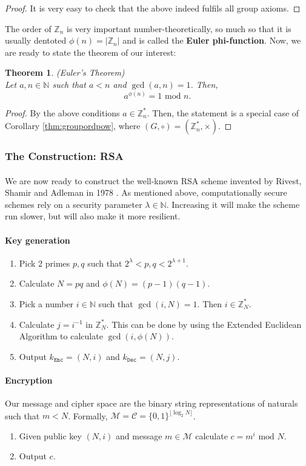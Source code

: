 \documentclass{article}
\newtheorem{theorem}{Theorem}[section]
\theoremstyle{definition}
\newcommand{\Enc}{\texttt{Enc}}
\newcommand{\Dec}{\texttt{Dec}}
\newcommand{\M}{\mathcal{M}}
\renewcommand{\C}{\mathcal{C}}
\newcommand{\Int}{\mathbb{Z}}
\newcommand{\Nat}{\mathbb{N}}
\renewcommand{\mod}{\,\,\text{mod}\,\,}
\begin{document}
\begin{proof}
  It is very easy to check that the above indeed fulfils all group axioms.
\end{proof}
The order of $\Int_n$ is very important number-theoretically, so much so that it
is usually dentoted $\phi(n) = |\Int_n|$ and is called the \textbf{Euler phi-function}.
Now, we are ready to state the theorem of our interest:
\begin{theorem}{(Euler's Theorem)}\\
  \label{thm:eulersthm}
  Let $a, n \in \Nat$ such that $a < n$ and $\gcd(a, n) = 1$. Then,
  \[
    a^{\phi(n)} = 1 \mod n.
  \]
\end{theorem}
\begin{proof}
  By the above conditions $a \in \Int^*_n$. Then, the statement is a special
  case of Corollary \ref{thm:groupordpow}, where $(G, \circ) = (\Int^*_n, \times)$.
\end{proof}
\subsubsection{The Construction: RSA}
\paragraph{}
We are now ready to construct the well-known RSA scheme invented by Rivest,
Shamir and Adleman in 1978 \cite{rivest1978method}. As mentioned above, computationally secure schemes rely on
a security parameter $\lambda \in \Nat$. Increasing it will make the scheme run
slower, but will also make it more resilient. 
\paragraph{Key generation}
\begin{enumerate}
\item Pick 2 primes $p, q$ such that $2^\lambda < p, q <
2^{\lambda + 1}$.
\item Calculate $N = pq$ and $\phi(N) = (p - 1)(q - 1)$.
\item Pick a number $i \in \Nat$ such that $\gcd(i, N) = 1$. Then $i \in
  \Int^*_N$.
\item Calculate $j = i^{-1}$ in $\Int^*_N$. This can be done by using the
  Extended Euclidean Algorithm to calculate $\gcd(i, \phi(N))$.
\item Output $k_\Enc = (N, i)$ and $k_\Dec = (N, j)$.
\end{enumerate}
\paragraph{Encryption}
Our message and cipher space are the binary string representations of naturals such that $m
< N$. Formally, $\M = \C = \{0, 1\}^{\lfloor {\log_2N} \rfloor}$.
\begin{enumerate}
\item Given public key $(N, i)$ and message $m \in \M$ calculate $c = m^i \mod N$.
\item Output $c$.
\end{enumerate}
\end{document}

